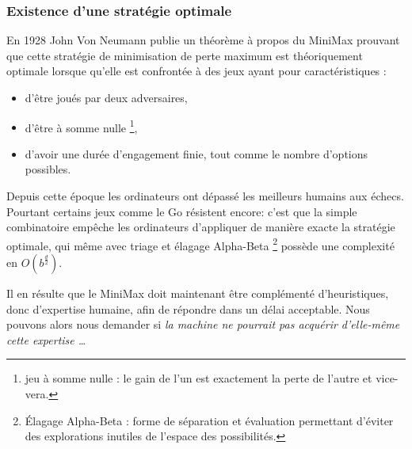 \subsubsection{Existence d'une stratégie optimale}

En 1928 John Von Neumann publie un théorème à propos du \og MiniMax \fg{} prouvant que cette stratégie de minimisation de perte maximum est théoriquement optimale lorsque qu'elle est confrontée à des jeux ayant pour caractéristiques :

\begin{itemize}
\item d'être joués par deux adversaires,
\item d'être à \og somme nulle \fg{} \footnote{ jeu à \og somme nulle \fg{}: le gain de l'un est exactement la perte de l'autre et vice-vera. },
\item d'avoir une durée d'engagement finie, tout comme le nombre d'options possibles.
\end{itemize}

Depuis cette époque les ordinateurs ont dépassé les meilleurs humains aux échecs. Pourtant certains jeux comme le Go résistent encore: c'est que la simple combinatoire empêche les ordinateurs d'appliquer de manière exacte la stratégie optimale, qui même avec triage et élagage \og Alpha-Beta \fg \footnote{ \og Élagage Alpha-Beta \fg : forme de séparation et évaluation permettant d'éviter des explorations inutiles de l'espace des possibilités. } possède une complexité en $O(b^{\frac{d}{2}})$.

Il en résulte que le \og MiniMax \fg{} doit maintenant être complémenté d'heuristiques, donc d'expertise humaine, afin de répondre dans un délai acceptable. Nous pouvons alors nous demander si \emph{la machine ne pourrait pas acquérir d'elle-même cette expertise \dots }